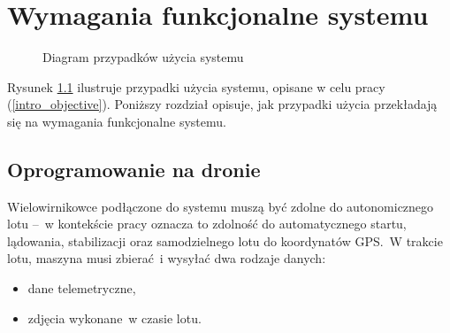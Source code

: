 \chapter{Wymagania funkcjonalne systemu} \label{chapter_functional_requirements}

\begin{figure}[H]
\centering\small
\label{top_level_use_case_diagram}
\caption{
    Diagram przypadków użycia systemu
}
\end{figure}

Rysunek \ref{top_level_use_case_diagram} ilustruje przypadki użycia systemu,
opisane w celu pracy (\ref{intro_objective}). Poniższy rozdział opisuje, jak
przypadki użycia przekładają się na wymagania funkcjonalne systemu.

\section{Oprogramowanie na dronie}

Wielowirnikowce podłączone do systemu muszą być
zdolne do autonomicznego lotu --~w kontekście pracy
oznacza to zdolność do automatycznego startu,
lądowania, stabilizacji oraz samodzielnego
lotu do koordynatów GPS.~W trakcie lotu, maszyna musi
zbierać~i wysyłać dwa rodzaje danych:
\begin{itemize}
    \item dane telemetryczne,
    \item zdjęcia wykonane~w czasie lotu.
\end{itemize}

